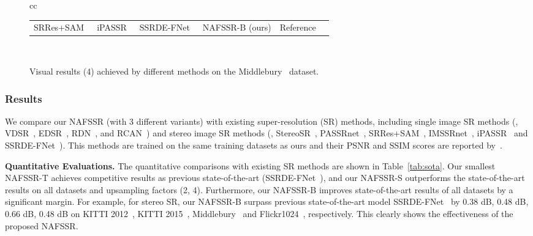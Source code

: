 \documentclass[10pt,twocolumn,letterpaper]{article}
\begin{document}
\begin{figure*}[t]
\begin{tabular}{cc}
\begin{adjustbox}{valign=t}
\begin{tabular}{cccccc}
SRRes+SAM~\cite{ying2020stereo} \hspace{-4mm} &
iPASSR~\cite{wang2021symmetric} \hspace{-4mm} &
SSRDE-FNet~\cite{dai2021feedback}  \hspace{-4mm} &
NAFSSR-B (ours) \hspace{-4mm} &
Reference \hspace{-4mm} 
\\
\end{tabular}
\end{adjustbox}
\vspace{1mm}
\\

\vspace{-6mm}
\end{tabular}
\caption{Visual results (4) achieved by different methods on the  Middlebury~\cite{scharstein2014high} dataset. 
}
\label{fig:middlebury}
\vspace{-3mm}
\end{figure*} 
\vspace{-1mm}
\subsubsection{Results}
We compare our NAFSSR (with 3 different variants) with existing super-resolution (SR) methods, including single image SR methods (\ie, VDSR~\cite{kim2016accurate}, EDSR~\cite{lim2017enhanced}, RDN~\cite{zhang2018residual}, and RCAN~\cite{zhang2018image}) and stereo image SR methods (\ie, StereoSR~\cite{jeon2018enhancing}, PASSRnet~\cite{wang2019learning}, SRRes+SAM~\cite{ying2020stereo}, IMSSRnet~\cite{lei2020deep}, iPASSR~\cite{wang2021symmetric} and SSRDE-FNet~\cite{dai2021feedback}). This methods are trained on the same training datasets as ours and their PSNR and SSIM scores are reported by~\cite{dai2021feedback}.

\textbf{Quantitative Evaluations.}
The quantitative comparisons with existing SR methods are shown in Table~\ref{tab:sota}. Our smallest NAFSSR-T achieves competitive results as previous state-of-the-art (SSRDE-FNet~\cite{dai2021feedback}), and our NAFSSR-S outperforms the state-of-the-art results on all datasets and upsampling factors (2, 4). Furthermore, our NAFSSR-B improves state-of-the-art results of all datasets by a significant margin.
For example, for  stereo SR, our NAFSSR-B surpass previous state-of-the-art model SSRDE-FNet~\cite{dai2021feedback} by 0.38 dB, 0.48 dB, 0.66 dB, 0.48 dB on KITTI 2012~\cite{geiger2012we}, KITTI 2015~\cite{menze2015object}, Middlebury~\cite{scharstein2014high} and Flickr1024~\cite{wang2019learning}, respectively. This clearly shows the effectiveness of the proposed NAFSSR.
\end{document}
